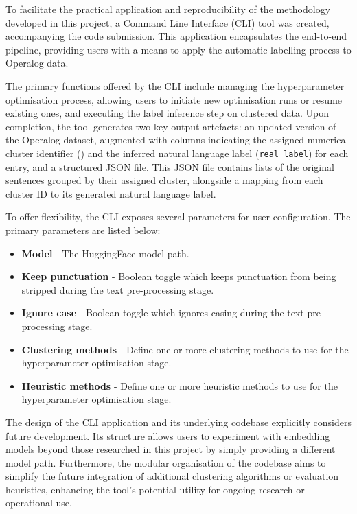 \documentclass[10pt,oneside]{report}
\begin{document}
To facilitate the practical application and reproducibility of the methodology developed in this project, a Command Line Interface (CLI) tool was created, accompanying the code submission. This application encapsulates the end-to-end pipeline, providing users with a means to apply the automatic labelling process to Operalog data.

The primary functions offered by the CLI include managing the hyperparameter optimisation process, allowing users to initiate new optimisation runs or resume existing ones, and executing the label inference step on clustered data. Upon completion, the tool generates two key output artefacts: an updated version of the Operalog dataset, augmented with columns indicating the assigned numerical cluster identifier () and the inferred natural language label (\texttt{real\_label}) for each entry, and a structured JSON file. This JSON file contains lists of the original sentences grouped by their assigned cluster, alongside a mapping from each cluster ID to its generated natural language label.

To offer flexibility, the CLI exposes several parameters for user configuration. The primary parameters are listed below:
\begin{itemize}
    \item \textbf{Model} - The HuggingFace model path.
    \item \textbf{Keep punctuation} - Boolean toggle which keeps punctuation from being stripped during the text pre-processing stage.
    \item \textbf{Ignore case} - Boolean toggle which ignores casing during the text pre-processing stage.
    \item \textbf{Clustering methods} - Define one or more clustering methods to use for the hyperparameter optimisation stage. 
    \item \textbf{Heuristic methods} - Define one or more heuristic methods to use for the hyperparameter optimisation stage.
\end{itemize}

The design of the CLI application and its underlying codebase explicitly considers future development. Its structure allows users to experiment with embedding models beyond those researched in this project by simply providing a different model path. Furthermore, the modular organisation of the codebase aims to simplify the future integration of additional clustering algorithms or evaluation heuristics, enhancing the tool's potential utility for ongoing research or operational use.
\end{document}
